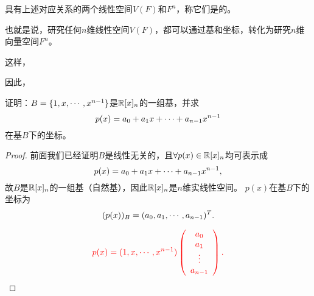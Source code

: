 \begin{frame}
具有上述对应关系的两个线性空间$V(F)$和$F^n$，称它们是的。 \vspace{.1in}

也就是说，研究任何$n$维线性空间$V(F)$，都可以通过基和坐标，转化为研究$n$维向量空间$F^n$。\vspace{.1in}

这样，
\vspace{.1in}

因此，
\end{frame}

\begin{frame} 
  \begin{li}
    证明：$B=\{1,x,\cdots,x^{n-1}\}$是$\mathbb R[x]_n$的一组基，并求
    $$
    p(x)=a_0+a_1x+\cdots+a_{n-1}x^{n-1}
    $$
    在基$B$下的坐标。
  \end{li} 
  \begin{proof}
    前面我们已经证明$B$是线性无关的，且$\forall p(x) \in \mathbb R[x]_n$均可表示成
    $$
    p(x)= a_0+a_1x+\cdots+a_{n-1}x^{n-1},
    $$
    故$B$是$\mathbb R[x]_n$的一组基（自然基），因此$\mathbb R[x]_n$是$n$维实线性空间。 
    $p(x)$在基$B$下的坐标为
    $$
    (p(x))_B=(a_0,a_1,\cdots,a_{n-1})^T.
    $$  
    \vspace{.1in} 
    
    $$
    \textcolor{red}{
    p(x) = (1, x, \cdots, x^{n-1}) 
    \left( \begin{array}{c} a_0\\ a_1\\ \vdots\\ a_{n-1} \end{array}\right).
    }
    $$
    
  \end{proof}
\end{frame}

